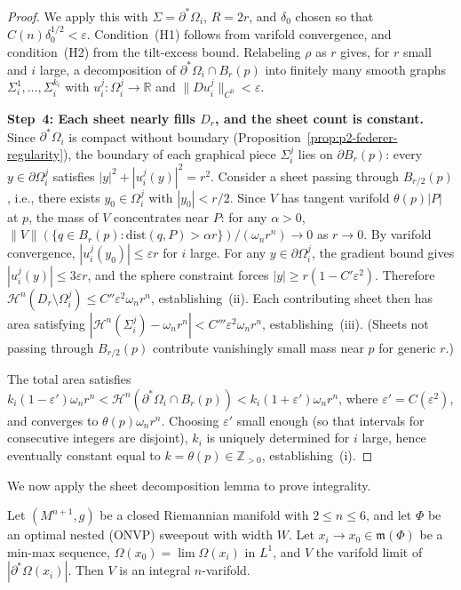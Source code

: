 \begin{proof}
We apply this with $\Sigma = \partial^*\Omega_i$, $R = 2r$, and $\delta_0$ chosen so that $C(n)\delta_0^{1/2} < \varepsilon$. Condition~(H1) follows from varifold convergence, and condition~(H2) from the tilt-excess bound. Relabeling $\rho$ as $r$ gives, for $r$ small and $i$ large, a decomposition of $\partial^*\Omega_i \cap B_r(p)$ into finitely many smooth graphs $\Sigma_i^1, \ldots, \Sigma_i^{k_i}$ with $u_i^j \colon \Omega_i^j \to \mathbb{R}$ and $\|Du_i^j\|_{C^0} < \varepsilon$.

\medskip\noindent\textbf{Step~4: Each sheet nearly fills $D_r$, and the sheet count is constant.}
Since $\partial^*\Omega_i$ is compact without boundary (Proposition~\ref{prop:p2-federer-regularity}), the boundary of each graphical piece $\Sigma_i^j$ lies on $\partial B_r(p)$: every $y \in \partial\Omega_i^j$ satisfies $|y|^2 + |u_i^j(y)|^2 = r^2$. Consider a sheet passing through $B_{r/2}(p)$, i.e., there exists $y_0 \in \Omega_i^j$ with $|y_0| < r/2$. Since $V$ has tangent varifold $\theta(p)|P|$ at $p$, the mass of $V$ concentrates near $P$: for any $\alpha > 0$, $\|V\|(\{q \in B_r(p) : \mathrm{dist}(q, P) > \alpha r\}) / (\omega_n r^n) \to 0$ as $r \to 0$. By varifold convergence, $|u_i^j(y_0)| \leq \varepsilon r$ for $i$ large. For any $y \in \partial\Omega_i^j$, the gradient bound gives $|u_i^j(y)| \leq 3\varepsilon r$, and the sphere constraint forces $|y| \geq r(1 - C'\varepsilon^2)$. Therefore $\mathcal{H}^n(D_r \setminus \Omega_i^j) \leq C''\varepsilon^2 \omega_n r^n$, establishing~(ii). Each contributing sheet then has area satisfying $|\mathcal{H}^n(\Sigma_i^j) - \omega_n r^n| < C'''\varepsilon^2\omega_n r^n$, establishing~(iii). (Sheets not passing through $B_{r/2}(p)$ contribute vanishingly small mass near $p$ for generic $r$.)

The total area satisfies $k_i(1 - \varepsilon')\omega_n r^n < \mathcal{H}^n(\partial^*\Omega_i \cap B_r(p)) < k_i(1 + \varepsilon')\omega_n r^n$, where $\varepsilon' = C(\varepsilon^2)$, and converges to $\theta(p)\omega_n r^n$. Choosing $\varepsilon'$ small enough (so that intervals for consecutive integers are disjoint), $k_i$ is uniquely determined for $i$ large, hence eventually constant equal to $k = \theta(p) \in \mathbb{Z}_{>0}$, establishing~(i).
\end{proof}

We now apply the sheet decomposition lemma to prove integrality.

\begin{proposition}\label{prop:integrality-nested}
Let $(M^{n+1}, g)$ be a closed Riemannian manifold with $2 \leq n \leq 6$, and let $\Phi$ be an optimal nested \textup{(}ONVP\textup{)} sweepout with width $W$. Let $x_i \to x_0 \in \mathfrak{m}(\Phi)$ be a min-max sequence, $\Omega(x_0) = \lim \Omega(x_i)$ in $L^1$, and $V$ the varifold limit of $|\partial^*\Omega(x_i)|$. Then $V$ is an integral $n$-varifold.
\end{proposition}

